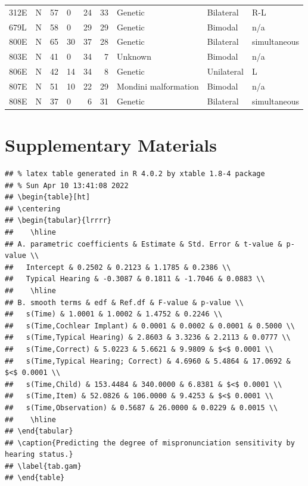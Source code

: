 \documentclass[
]{article}
\begin{document}
\begin{table}[!h]
\begin{tabular}[t]{llrlrrlll}
312E & N & 57 & 0 & 24 & 33 & Genetic & Bilateral & R-L\\
679L & N & 58 & 0 & 29 & 29 & Genetic & Bimodal & n/a\\
\addlinespace
800E & N & 65 & 30 & 37 & 28 & Genetic & Bilateral & simultaneous\\
803E & N & 41 & 0 & 34 & 7 & Unknown & Bimodal & n/a\\
806E & N & 42 & 14 & 34 & 8 & Genetic & Unilateral & L\\
807E & N & 51 & 10 & 22 & 29 & Mondini malformation & Bimodal & n/a\\
808E & N & 37 & 0 & 6 & 31 & Genetic & Bilateral & simultaneous\\
\bottomrule
\end{tabular}
\end{table}

\hypertarget{supplementary-materials}{%
\section{Supplementary Materials}\label{supplementary-materials}}

\begin{verbatim}
## % latex table generated in R 4.0.2 by xtable 1.8-4 package
## % Sun Apr 10 13:41:08 2022
## \begin{table}[ht]
## \centering
## \begin{tabular}{lrrrr}
##    \hline
## A. parametric coefficients & Estimate & Std. Error & t-value & p-value \\ 
##   Intercept & 0.2502 & 0.2123 & 1.1785 & 0.2386 \\ 
##   Typical Hearing & -0.3087 & 0.1811 & -1.7046 & 0.0883 \\ 
##    \hline
## B. smooth terms & edf & Ref.df & F-value & p-value \\ 
##   s(Time) & 1.0001 & 1.0002 & 1.4752 & 0.2246 \\ 
##   s(Time,Cochlear Implant) & 0.0001 & 0.0002 & 0.0001 & 0.5000 \\ 
##   s(Time,Typical Hearing) & 2.8603 & 3.3236 & 2.2113 & 0.0777 \\ 
##   s(Time,Correct) & 5.0223 & 5.6621 & 9.9809 & $<$ 0.0001 \\ 
##   s(Time,Typical Hearing; Correct) & 4.6960 & 5.4864 & 17.0692 & $<$ 0.0001 \\ 
##   s(Time,Child) & 153.4484 & 340.0000 & 6.8381 & $<$ 0.0001 \\ 
##   s(Time,Item) & 52.0826 & 106.0000 & 9.4253 & $<$ 0.0001 \\ 
##   s(Time,Observation) & 0.5687 & 26.0000 & 0.0229 & 0.0015 \\ 
##    \hline
## \end{tabular}
## \caption{Predicting the degree of mispronunciation sensitivity by hearing status.} 
## \label{tab.gam}
## \end{table}
\end{verbatim}
\end{document}
